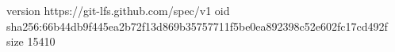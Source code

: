 version https://git-lfs.github.com/spec/v1
oid sha256:66b44db9f445ea2b72f13d869b35757711f5be0ea892398c52e602fc17cd492f
size 15410
